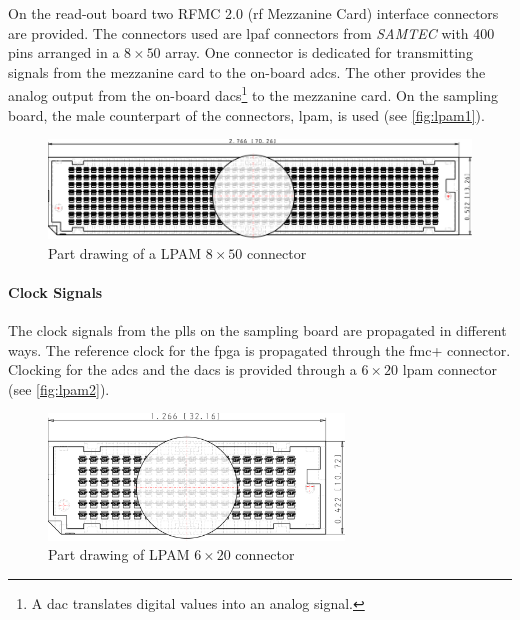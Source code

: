 On the read-out board two RFMC 2.0 (\gls{rf} Mezzanine Card) interface connectors are provided.
The connectors used are \gls{lpaf} connectors from \textit{SAMTEC} with 400 pins arranged in a $8\times50$ array.
One connector is dedicated for transmitting signals from the mezzanine card to the on-board \glspl{adc}.
The other provides the analog output from the on-board \glspl{dac}\footnote{A \gls{dac} translates digital values into an analog signal.} to the mezzanine card.
On the sampling board, the male counterpart of the connectors, \gls{lpam}, is used (see \autoref{fig:lpam1}).

\begin{figure}[tb]
	\centering
	\includegraphics[width = \textwidth]{chap/04-theresa/img/connectors/lpam_50_top.pdf}
	\caption[LPAM $8\times50$ connector]{Part drawing of a LPAM $8\times50$ connector}
	\label{fig:lpam1}
\end{figure}


\paragraph{Clock Signals}
The clock signals from the \glspl{pll} on the sampling board are propagated in different ways.
The reference clock for the \gls{fpga} is propagated through the \gls{fmc}+ connector.
Clocking for the \glspl{adc} and the \glspl{dac} is provided through a $6\times20$ \gls{lpam} connector (see \autoref{fig:lpam2}).
\begin{figure}[tb]
	\centering
	\includegraphics[width = 0.7\textwidth]{chap/04-theresa/img/connectors/lpam_20.pdf}
	\caption[LPAM $6\times20$ connector]{Part drawing of LPAM $6\times20$ connector}
	\label{fig:lpam2}
\end{figure}

